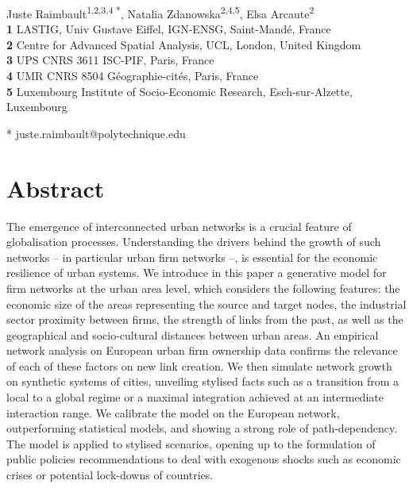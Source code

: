 \documentclass[10pt,letterpaper]{article}
\begin{document}
\justify
\vspace*{0.2in}

\begin{flushleft}
{\Large
\textbf{}
}
\newline

Juste Raimbault\textsuperscript{1,2,3,4 *},
Natalia Zdanowska\textsuperscript{2,4,5},
Elsa Arcaute\textsuperscript{2}
\\
\bigskip
\textbf{1} LASTIG, Univ Gustave Eiffel, IGN-ENSG, Saint-Mand{\'e}, France
\\
\textbf{2} Centre for Advanced Spatial Analysis, UCL, London, United Kingdom
\\
\textbf{3} UPS CNRS 3611 ISC-PIF, Paris, France
\\
\textbf{4} UMR CNRS 8504 G{\'e}ographie-cit{\'e}s, Paris, France
\\
\textbf{5} Luxembourg Institute of Socio-Economic Research, Esch-sur-Alzette, Luxembourg

\bigskip

* juste.raimbault@polytechnique.edu

\end{flushleft}


\section*{Abstract}
The emergence of interconnected urban networks is a crucial feature of globalisation processes. Understanding the drivers behind the growth of such networks -- in particular urban firm networks --, is essential for the economic resilience of urban systems. We introduce in this paper a generative model for firm networks at the urban area level, which considers the following features: the economic size of the areas representing the source and target nodes, the industrial sector proximity between firms, the strength of links from the past, as well as the geographical and socio-cultural distances between urban areas. An empirical network analysis on European urban firm ownership data confirms the relevance of each of these factors on new link creation. We then simulate network growth on synthetic systems of cities, unveiling stylised facts such as a transition from a local to a global regime or a maximal integration achieved at an intermediate interaction range. We calibrate the model on the European network, outperforming statistical models, and showing a strong role of path-dependency. The model is applied to stylised scenarios, opening up to the formulation of public policies recommendations to deal with exogenous shocks such as economic crises or potential lock-downs of countries.
\end{document}
